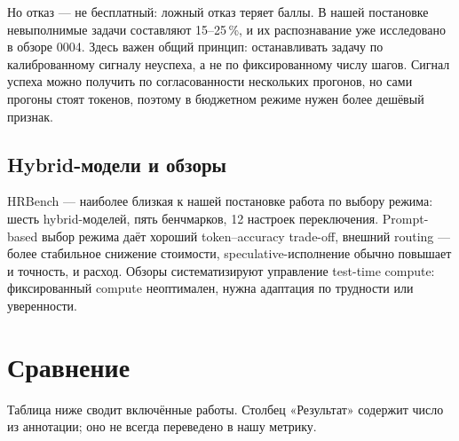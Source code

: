 \documentclass[11pt,a4paper]{article}
\begin{document}
Но отказ — не бесплатный: ложный отказ теряет баллы. В нашей постановке
невыполнимые задачи составляют 15--25\,\%, и их распознавание уже
исследовано в обзоре 0004. Здесь важен общий принцип: останавливать задачу
по калиброванному сигналу неуспеха, а не по фиксированному числу шагов.
Сигнал успеха можно получить по согласованности нескольких прогонов, но
сами прогоны стоят токенов, поэтому в бюджетном режиме нужен более дешёвый
признак.

\subsection{Hybrid-модели и обзоры}

HRBench \cite{ning2026hrbenchbenchmarkin} — наиболее близкая к нашей
постановке работа по выбору режима: шесть hybrid-моделей, пять бенчмарков,
12 настроек переключения. Prompt-based выбор режима даёт хороший
token--accuracy trade-off, внешний routing — более стабильное снижение
стоимости, speculative-исполнение обычно повышает и точность, и расход.
Обзоры \cite{alomrani2025reasoningbudget,sui2025stopoverthinking}
систематизируют управление test-time compute: фиксированный compute
неоптимален, нужна адаптация по трудности или уверенности.

\section{Сравнение}

Таблица ниже сводит включённые работы. Столбец «Результат» содержит число
из аннотации; оно не всегда переведено в нашу метрику.
\end{document}
